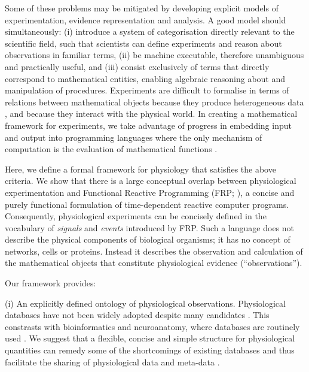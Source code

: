 Some of these problems may be mitigated by developing explicit models
of experimentation, evidence representation and analysis. A good model
should simultaneously: (i) introduce a system of categorisation
directly relevant to the scientific field, such that scientists can
define experiments and reason about observations in familiar terms,
(ii) be machine executable, therefore unambiguous and practically
useful, and (iii) consist exclusively of terms that directly
correspond to mathematical entities, enabling algebraic reasoning
about and manipulation of procedures.  Experiments are difficult to
formalise in terms of relations between mathematical objects because
they produce heterogeneous data \citep{Tukey1962}, and because they
interact with the physical world. In creating a mathematical framework
for experiments, we take advantage of progress in embedding input and
output \citep{PeytonJones2002, Wadler1995} into programming languages
where the only mechanism of computation is the evaluation of
mathematical functions \citep{Church1941}.

Here, we define a formal framework for physiology
that satisfies the above criteria. We show that there
is a large conceptual overlap between physiological experimentation
and Functional Reactive Programming (FRP; \citep{Elliott1997,
  Nilsson2002}), a concise and purely functional formulation of
time-dependent reactive computer programs. Consequently, physiological
experiments can be concisely defined in the vocabulary of
\emph{signals} and \emph{events} introduced by FRP. Such a language
does not describe the physical components of biological organisms; it
has no concept of networks, cells or proteins. Instead it describes
the observation and calculation of the mathematical objects that
constitute physiological evidence (``observations'').

Our framework provides:

(i) An explicitly defined ontology of physiological
observations. Physiological databases have not been widely adopted
\citep{Herz2008, Amari2002} despite many candidates \citep{Jessop2010,
  Teeters2008, Frishkoff2009, Katz2010}.  This constrasts with
bioinformatics and neuroanatomy, where databases are routinely used
\citep{Rodriguez-Tome1996, Ascoli2007}. We suggest that a flexible,
concise and simple structure for physiological quantities can remedy
some of the shortcomings \citep{Gardner2005, Amari2002} of existing
databases and thus facilitate the sharing of physiological data and
meta-data \citep{Insel2003}.

